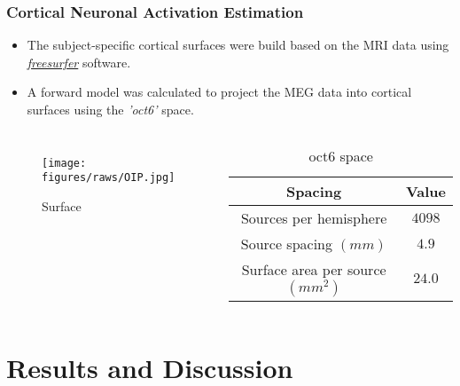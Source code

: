 \documentclass[aspectratio=169]{beamer}
\begin{document}
\begin{frame}
    \frametitle{Cortical Neuronal Activation Estimation}

    \begin{itemize}
        \item The subject-specific cortical surfaces were build based on the MRI data using \hyperlink{https://surfer.nmr.mgh.harvard.edu/}{\emph{freesurfer}} software.
        \item A forward model was calculated to project the MEG data into cortical surfaces using the \emph{'oct6'} space.
    \end{itemize}

    \begin{columns}

        \begin{figure}[h]
            \centering
            \texttt{[image: figures/raws/OIP.jpg]}
            \caption{Surface}
        \end{figure}


        \begin{table}
            \renewcommand{\arraystretch}{1.2}
            \caption{oct6 space}

            \begin{tabular}{|c|c|}
                \hline
                \textbf{Spacing}                 & \textbf{Value} \\
                \hline
                \hline
                Sources per hemisphere           & $4098$         \\
                Source spacing $(mm)$            & $4.9$          \\
                Surface area per source $(mm^2)$ & $24.0$         \\
                \hline
            \end{tabular}

        \end{table}

    \end{columns}

\end{frame}

\section{Results and Discussion}
\end{document}
